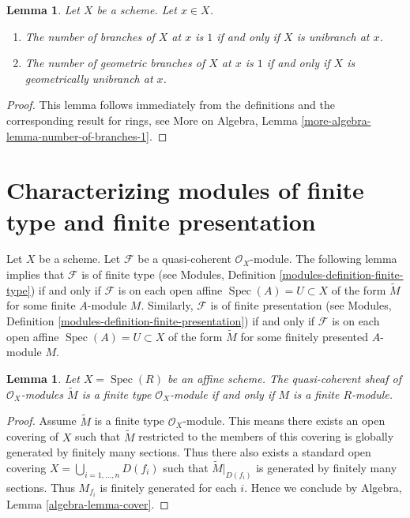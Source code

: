 \documentclass{stacks-project}
\theoremstyle{plain}
\newtheorem{lemma}[subsection]{Lemma}
\theoremstyle{definition}
\theoremstyle{remark}
\numberwithin{equation}{subsection}
\def\Spec{\mathop{\mathrm{Spec}}}
\begin{document}
\begin{lemma}
\label{lemma-number-of-branches-1}
Let $X$ be a scheme. Let $x \in X$.
\begin{enumerate}
\item The number of branches of $X$ at $x$ is $1$ if and only if
$X$ is unibranch at $x$.
\item The number of geometric branches of $X$ at $x$ is $1$ if and only if
$X$ is geometrically unibranch at $x$.
\end{enumerate}
\end{lemma}

\begin{proof}
This lemma follows immediately from the definitions and the corresponding
result for rings, see More on Algebra, Lemma
\ref{more-algebra-lemma-number-of-branches-1}.
\end{proof}






\section{Characterizing modules of finite type and finite presentation}
\label{section-characterizing-finite-type-presentation}

\noindent
Let $X$ be a scheme.
Let $\mathcal{F}$ be a quasi-coherent $\mathcal{O}_X$-module.
The following lemma implies that $\mathcal{F}$ is of finite type
(see Modules, Definition \ref{modules-definition-finite-type})
if and only if $\mathcal{F}$ is
on each open affine $\Spec(A) = U \subset X$
of the form $\widetilde M$ for some finite $A$-module $M$.
Similarly, $\mathcal{F}$ is of finite presentation
(see Modules, Definition \ref{modules-definition-finite-presentation})
if and only if $\mathcal{F}$ is
on each open affine $\Spec(A) = U \subset X$
of the form $\widetilde M$ for some finitely presented $A$-module $M$.

\begin{lemma}
\label{lemma-finite-type-module}
Let $X = \Spec(R)$ be an affine scheme.
The quasi-coherent sheaf of $\mathcal{O}_X$-modules
$\widetilde M$ is a finite type $\mathcal{O}_X$-module
if and only if $M$ is a finite $R$-module.
\end{lemma}

\begin{proof}
Assume $\widetilde M$ is a finite type $\mathcal{O}_X$-module.
This means there exists an open covering of $X$ such that
$\widetilde M$ restricted to the members of this covering is
globally generated by finitely many sections.
Thus there also exists a standard open covering
$X = \bigcup_{i = 1, \ldots, n} D(f_i)$ such that $\widetilde M|_{D(f_i)}$
is generated by finitely many sections. Thus $M_{f_i}$ is finitely
generated for each $i$. Hence we conclude by
Algebra, Lemma \ref{algebra-lemma-cover}.
\end{proof}
\end{document}
